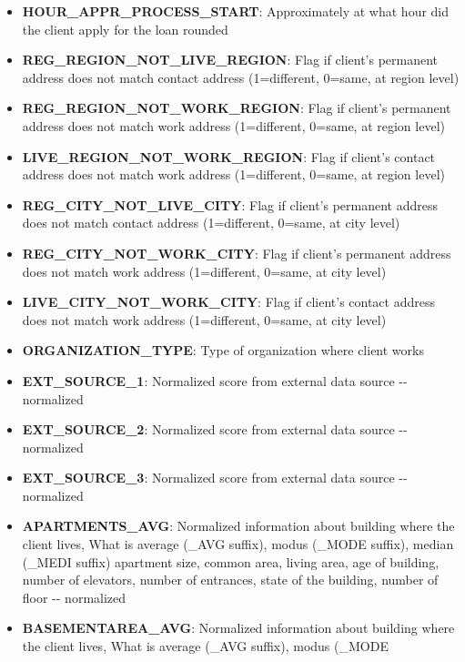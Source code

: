 \documentclass[11pt]{article}
\begin{document}
\begin{itemize}
\item
  \textbf{HOUR\_APPR\_PROCESS\_START}: Approximately at what hour did
  the client apply for the loan rounded
\item
  \textbf{REG\_REGION\_NOT\_LIVE\_REGION}: Flag if client's permanent
  address does not match contact address (1=different, 0=same, at region
  level)\\
\item
  \textbf{REG\_REGION\_NOT\_WORK\_REGION}: Flag if client's permanent
  address does not match work address (1=different, 0=same, at region
  level)
\item
  \textbf{LIVE\_REGION\_NOT\_WORK\_REGION}: Flag if client's contact
  address does not match work address (1=different, 0=same, at region
  level)\\
\item
  \textbf{REG\_CITY\_NOT\_LIVE\_CITY}: Flag if client's permanent
  address does not match contact address (1=different, 0=same, at city
  level)\\
\item
  \textbf{REG\_CITY\_NOT\_WORK\_CITY}: Flag if client's permanent
  address does not match work address (1=different, 0=same, at city
  level)\\
\item
  \textbf{LIVE\_CITY\_NOT\_WORK\_CITY}: Flag if client's contact address
  does not match work address (1=different, 0=same, at city level)\\
\item
  \textbf{ORGANIZATION\_TYPE}: Type of organization where client works\\
\item
  \textbf{EXT\_SOURCE\_1}: Normalized score from external data source
  -\/- normalized
\item
  \textbf{EXT\_SOURCE\_2}: Normalized score from external data source
  -\/- normalized
\item
  \textbf{EXT\_SOURCE\_3}: Normalized score from external data source
  -\/- normalized
\item
  \textbf{APARTMENTS\_AVG}: Normalized information about building where
  the client lives, What is average (\_AVG suffix), modus (\_MODE
  suffix), median (\_MEDI suffix) apartment size, common area, living
  area, age of building, number of elevators, number of entrances, state
  of the building, number of floor -\/- normalized
\item
  \textbf{BASEMENTAREA\_AVG}: Normalized information about building
  where the client lives, What is average (\_AVG suffix), modus (\_MODE

\end{itemize}
\end{document}
